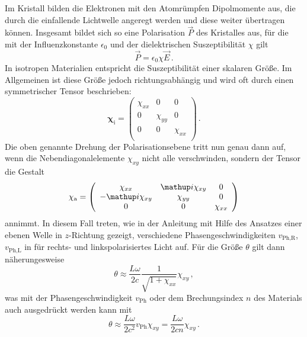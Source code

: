Im Kristall bilden die Elektronen mit den Atomrümpfen Dipolmomente aus,
die durch die einfallende Lichtwelle angeregt werden und diese weiter
übertragen können.
Insgesamt bildet sich so eine Polarisation $\vec{P}$ des Kristalles aus,
für die mit der Influenzkonstante $\epsilon_0$ und der dielektrischen
Suszeptibilität $\chi$ gilt
\begin{equation}
    \label{eqn:polarisation}
    \vec{P} = \epsilon_0\chi\vec{E}\,.
\end{equation}
In isotropen Materialien entspricht die Suszeptibilität einer skalaren Größe.
Im Allgemeinen ist diese Größe jedoch richtungsabhängig und wird oft
durch einen symmetrischer Tensor beschrieben:
\begin{equation}
    \label{eqn:suszeptibilitaet_inaktiv}
    \mathbf{\chi}_\text{i} =
    \left(\begin{array}{ccc}
        \chi_{xx} & 0 & 0 \\
        0 & \chi_{yy} & 0 \\
        0 & 0 & \chi_{xx} \\
    \end{array}\right)\,.
\end{equation}
Die oben genannte Drehung der Polarisationsebene tritt nun genau dann auf, wenn
die Nebendiagonalelemente $\chi_{xy}$ nicht alle verschwinden, sondern der
Tensor die Gestalt
\begin{equation}
    \label{eqn:suszeptibilitaet_aktiv}
    \mathbf{\chi}_\text{a} =
    \left(\begin{array}{ccc}
        \chi_{xx}    & \i\chi_{xy} & 0 \\
        -\i\chi_{xy} & \chi_{yy}   & 0 \\
        0            & 0           & \chi_{xx} \\
    \end{array}\right)
\end{equation}
annimmt. In diesem Fall treten, wie in der Anleitung \cite{V46} mit Hilfe
des Ansatzes einer ebenen Welle in $z$-Richtung gezeigt, verschiedene
Phasengeschwindigkeiten $v_\text{Ph,R}$, $v_\text{Ph,L}$ in für rechts- und
linkspolarisiertes Licht auf.
Für die Größe $\theta$ gilt dann näherungesweise
\begin{equation}
    \label{eqn:theta_cirkular}
    \theta \approx \frac{L\omega}{2c}\frac{1}{\sqrt{1+\chi_{xx}}}\chi_{xy}\,,
\end{equation}
was mit der Phasengeschwindigkeit $v_\text{Ph}$ oder dem Brechungsindex $n$
des Materials auch ausgedrückt werden kann mit
\begin{equation}
    \label{eqn:theta_n}
    \theta
    \approx \frac{L\omega}{2c^2}v_\text{Ph}\chi_{xy}
    = \frac{L\omega}{2cn}\chi_{xy}\,.
\end{equation}

